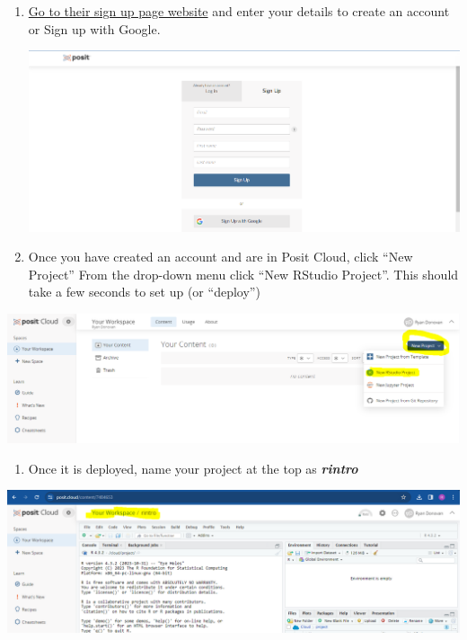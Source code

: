 \documentclass[
]{book}
\providecommand{\tightlist}{%
  \setlength{\itemsep}{0pt}\setlength{\parskip}{0pt}}
\begin{document}
\begin{enumerate}
\def\labelenumi{\arabic{enumi}.}
\item
  \href{https://login.posit.cloud/register?redirect=\%2Foauth\%2Fauthorize\%3Fredirect_uri\%3Dhttps\%253A\%252F\%252Fposit.cloud\%252Flogin\%26client_id\%3Dposit-cloud\%26response_type\%3Dcode\%26show_auth\%3D0}{Go to their sign up page website} and enter your details to create an account or Sign up with Google.

  \includegraphics{img/01-posit-sign-up.png}
\item
  Once you have created an account and are in Posit Cloud, click ``New Project'' From the drop-down menu click ``New RStudio Project''. This should take a few seconds to set up (or ``deploy'')
\end{enumerate}

\includegraphics{img/01-posit-newproject.png}

\begin{enumerate}
\def\labelenumi{\arabic{enumi}.}
\setcounter{enumi}{2}
\tightlist
\item
  Once it is deployed, name your project at the top as \textbf{\emph{rintro}}
\end{enumerate}

\includegraphics{img/01-posit-rintro.png}
\end{document}
